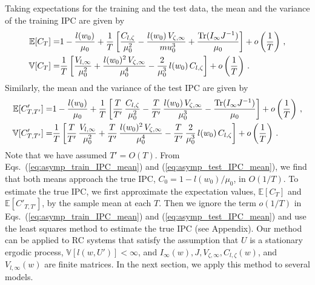 \documentclass{article}
\begin{document}
Taking expectations for the training and the test data, the mean and the variance of the training IPC are given by 
\begin{align} 
 \mathbb{E}[C_T] 
  =& 1 - \frac{l(w_0)}{\mu_0} + \frac{1}{T} \left[ \frac{C_{l, \zeta}}{\mu_0^2} - \frac{l(w_0) \, V_{\zeta, \infty}}{\ mu_0^3} + \frac{{\rm Tr}(I_\infty J^{-1})}{\mu_0} \right] + o\left( \frac{1}{T} \right) \, , 
  \label{eq:asymp_train_IPC_mean} \\ 
 \mathbb{V}[C_T] 
  =& \frac{1}{T} \left[ \frac{V_{l, \infty}}{\mu_0^2} + \frac{l(w_0)^2 \, V_{\zeta, \infty}}{\mu_0^4} - \frac{2}{\mu_0^3} \, l(w_0) \, C_{l, \zeta} \right] + o\left( \frac{1}{T} \right) \, .
 \label{eq:asymp_train_IPC_var} 
\end{align}
Similarly, the mean and the variance of the test IPC are given by
\begin{align} 
 \mathbb{E}[C'_{T, T'}] 
  =& 1 - \frac{l(w_0)}{\mu_0} + \frac{1}{T} \left[ \frac{T}{T'} \, \frac{C_{l, \zeta}} {\mu_0^2} - \frac{T}{T'} \, \frac{l(w_0) \, V_{\zeta, \infty}}{\mu_0^3} - \frac{{\rm Tr}(I_\infty J^{-1})}{\mu_0} \right] + o\left( \frac{1}{T} \right) \, , 
  \label{eq:asymp_test_IPC_mean} \\ 
 \mathbb{V}[C'_{T, T'}] 
  =& \frac{1}{T} \left[ \frac{T}{T'} \, \frac{V_{l, \infty}}{\mu_0^2} + \frac{T}{T'} \, \frac{l(w_0)^2 \, V_{\zeta, \infty}}{\mu_0^4} - \frac{T}{T'} \, \frac{2}{\mu_0^3} \, l(w_0) \, C_{l, \zeta} \right] + o\left( \frac{1}{T} \right) \, .
  \label{eq:asymp_test_IPC_var}
\end{align}
Note that we have assumed $T' = O(T)$. 
From Eqs.~(\ref{eq:asymp_train_IPC_mean}) and (\ref{eq:asymp_test_IPC_mean}), we find that both means approach the true IPC, $C_0 = 1 - l(w_0) / \mu_0$, in $O(1/T)$. 
To estimate the true IPC, we first approximate the expectation values, $\mathbb{E}[C_T]$ and $\mathbb{E}[C'_{T, T'}]$, by the sample mean at each $T$. 
Then we ignore the term $o(1/T)$ in Eqs.~(\ref{eq:asymp_train_IPC_mean}) and (\ref{eq:asymp_test_IPC_mean}) and use the least squares method to estimate the true IPC (see Appendix). 
Our method can be applied to RC systems that satisfy the assumption that $U$ is a stationary ergodic process, $\mathbb{V}[l(w, U')] < \infty$, and $I_\infty(w), J, V_{\zeta, \infty}, C_{l,\zeta}(w)$, and $V_{l, \infty}(w)$ are finite matrices. 
In the next section, we apply this method to several models. 
\end{document}
